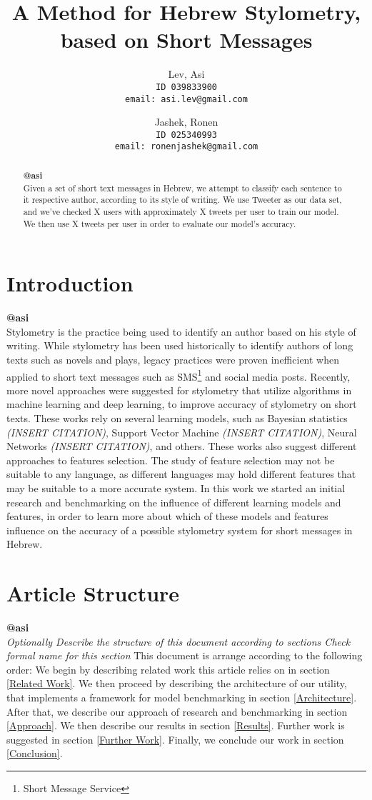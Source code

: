 \documentclass[a4paper,twocolumn]{article}
\author{Lev, Asi\\
	\texttt{ID 039833900}\\
	\texttt{email: asi.lev@gmail.com}
	\and
	Jashek, Ronen\\
	\texttt{ID 025340993}\\
	\texttt{email: ronenjashek@gmail.com}	
}
\title{A Method for Hebrew Stylometry, based on Short Messages}
\date{}
\begin{document}
\maketitle
\begin{abstract}
\textbf{@asi}\\
Given a set of short text messages in Hebrew, we attempt to classify each sentence to it respective author, according to its style of writing.
We use Tweeter as our data set, and we've checked X users with approximately X tweets per user to train our model.
We then use X tweets per user in order to evaluate our model's accuracy.
\end{abstract}
\section{Introduction}
\textbf{@asi}\\
Stylometry is the practice being used to identify an author based on his style of writing.
While stylometry has been used historically to identify authors of long texts such as novels and plays, legacy practices were proven inefficient when applied to short text messages such as SMS\footnote{Short Message Service} and social media posts.
Recently, more novel approaches were suggested for stylometry that utilize algorithms in machine learning and deep learning, to improve accuracy of stylometry on short texts.
These works rely on several learning models, such as Bayesian statistics \emph{(INSERT CITATION)}, Support Vector Machine \emph{(INSERT CITATION)}, Neural Networks \emph{(INSERT CITATION)}, and others.
These works also suggest different approaches to features selection. The study of feature selection may not be suitable to any language, as different languages may hold different features that may be suitable to a more accurate system.
In this work we started an initial research and benchmarking on the influence of different learning models and features, in order to learn more about which of these models and features influence on the accuracy of a possible stylometry system for short messages in Hebrew.
\section{Article Structure}
\textbf{@asi}\\
\emph{Optionally
Describe the structure of this document according to sections
Check formal name for this section
}
This document is arrange according to the following order:
We begin by describing related work this article relies on in section \ref{Related Work}.
We then proceed by describing the architecture of our utility, that implements a framework for model benchmarking in section \ref{Architecture}.
After that, we describe our approach of research and benchmarking in section \ref{Approach}.
We then describe our results in section \ref{Results}.
Further work is suggested in section \ref{Further Work}.
Finally, we conclude our work in section \ref{Conclusion}.
\end{document}
